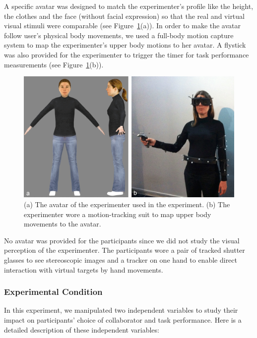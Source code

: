 A specific avatar was designed to match the experimenter's profile like the height, the clothes and the face (without facial expression) so that the real and virtual visual stimuli were comparable (see Figure~\ref{fig:2_avatar}(a)). In order to make the avatar follow user's physical body movements, we used a full-body motion capture system to map the experimenter's upper body motions to her avatar. A flystick was also provided for the experimenter to trigger the timer for task performance measurements (see Figure~\ref{fig:2_avatar}(b)).

\begin{figure}[tb]
  \centering
  \includegraphics[width=\textwidth]{figures/ch2/avatar_photo}
  \caption{\label{fig:2_avatar}(a) The avatar of the experimenter used in the experiment. (b) The experimenter wore a motion-tracking suit to map upper body movements to the avatar.}
\end{figure}

No avatar was provided for the participants since we did not study the visual perception of the experimenter. The participants wore a pair of tracked shutter glasses to see stereoscopic images and a tracker on one hand to enable direct interaction with virtual targets by hand movements.

\subsubsection{Experimental Condition}
In this experiment, we manipulated two independent variables to study their impact on participants' choice of collaborator and task performance. Here is a detailed description of these independent variables:

